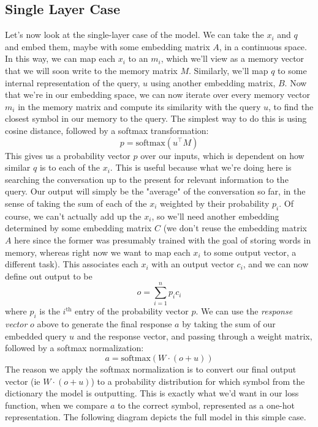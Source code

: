 \documentclass{article}
\begin{document}
\subsection{Single Layer Case}
Let's now look at the single-layer case of the model. We can take the $ x_i $ and $ q $ and embed them, maybe with some embedding matrix $ A $, in a continuous space. In this way, we can map each $ x_i $ to an $ m_i $, which we'll view as a memory vector that we will soon write to the memory matrix $ M $. Similarly, we'll map $ q $ to some internal representation of the query, $ u $ using another embedding matrix, $ B $. Now that we're in our embedding space, we can now iterate over every memory vector $ m_i $ in the memory matrix and compute its similarity with the query $ u $, to find the closest symbol in our memory to the query. The simplest way to do this is using cosine distance, followed by a softmax transformation:
$$ p = \text{softmax}(u^\intercal M) $$
This gives us a probability vector $ p $ over our inputs, which is dependent on how similar $ q $ is to each of the $ x_i $. This is useful because what we're doing here is searching the conversation up to the present for relevant information to the query. Our output will simply be the "average" of the conversation so far, in the sense of taking the sum of each of the $ x_i $ weighted by their probability $ p_i $. Of course, we can't actually add up the $ x_i $, so we'll need another embedding determined by some embedding matrix $ C $ (we don't reuse the embedding matrix $ A $ here since the former was presumably trained with the goal of storing words in memory, whereas right now we want to map each $ x_i $ to some output vector, a different task). This associates each $ x_i $ with an output vector $ c_i $, and we can now define out output to be
$$ o = \sum_{i = 1}^n p_i c_i $$
where $ p_i $ is the $ i^{\text{th}} $ entry of the probability vector $ p $. We can use the \textit{response vector} $ o $ above to generate the final response $ a $ by taking the sum of our embedded query $ u $ and the response vector, and passing through a weight matrix, followed by a softmax normalization:
$$ a = \text{softmax}(W \cdot (o + u)) $$
The reason we apply the softmax normalization is to convert our final output vector (ie $ W \cdot (o + u) $) to a probability distribution for which symbol from the dictionary the model is outputting. This is exactly what we'd want in our loss function, when we compare $ a $ to the correct symbol, represented as a one-hot representation. The following diagram depicts the full model in this simple case.
\end{document}
